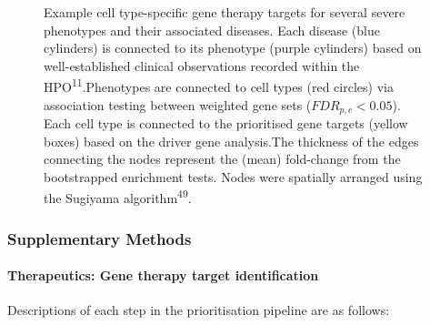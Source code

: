 \documentclass[
sn-nature
]{sn-jnl}
\let\oldparagraph\paragraph
\renewcommand{\paragraph}[1]{\oldparagraph{#1}\mbox{}}
\begin{document}
\begin{figure}
\begin{minipage}{\linewidth}
{}


\end{minipage}%

\caption{\label{fig-therapy-examples-supp}Example cell type-specific
gene therapy targets for several severe phenotypes and their associated
diseases. Each disease (blue cylinders) is connected to its phenotype
(purple cylinders) based on well-established clinical observations
recorded within the HPO\textsuperscript{11}.Phenotypes are connected to
cell types (red circles) via association testing between weighted gene
sets (\(FDR_{p,c}<0.05\)). Each cell type is connected to the
prioritised gene targets (yellow boxes) based on the driver gene
analysis.The thickness of the edges connecting the nodes represent the
(mean) fold-change from the bootstrapped enrichment tests. Nodes were
spatially arranged using the Sugiyama algorithm\textsuperscript{49}.}

\end{figure}%

\subsubsection{Supplementary Methods}\label{supplementary-methods}

\paragraph{Therapeutics: Gene therapy target
identification}\label{therapeutics-gene-therapy-target-identification}

Descriptions of each step in the prioritisation pipeline are as follows:
\end{document}
